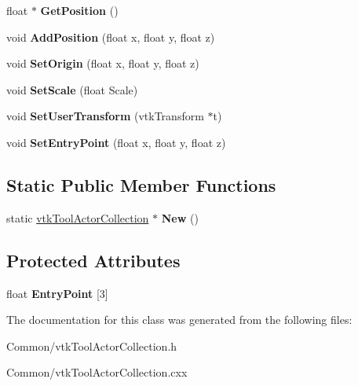 \begin{DoxyCompactItemize}
\item 
\hypertarget{classvtkToolActorCollection_a25382150c57a326ecbc2c5538d9884a7}{
float $\ast$ {\bfseries GetPosition} ()}
\label{classvtkToolActorCollection_a25382150c57a326ecbc2c5538d9884a7}

\item 
\hypertarget{classvtkToolActorCollection_a9169cec363eb65c2f9b40a7a59388d25}{
void {\bfseries AddPosition} (float x, float y, float z)}
\label{classvtkToolActorCollection_a9169cec363eb65c2f9b40a7a59388d25}

\item 
\hypertarget{classvtkToolActorCollection_aabfe1be268bcd17c02f8d83708b3e297}{
void {\bfseries SetOrigin} (float x, float y, float z)}
\label{classvtkToolActorCollection_aabfe1be268bcd17c02f8d83708b3e297}

\item 
\hypertarget{classvtkToolActorCollection_aae253ba215ebc5a6d23822b759ef4861}{
void {\bfseries SetScale} (float Scale)}
\label{classvtkToolActorCollection_aae253ba215ebc5a6d23822b759ef4861}

\item 
\hypertarget{classvtkToolActorCollection_a5ff2ee03fe6996abefc2d7b19b2d7133}{
void {\bfseries SetUserTransform} (vtkTransform $\ast$t)}
\label{classvtkToolActorCollection_a5ff2ee03fe6996abefc2d7b19b2d7133}

\item 
\hypertarget{classvtkToolActorCollection_a51bd81bdb83e94379eed793dfcedcdfd}{
void {\bfseries SetEntryPoint} (float x, float y, float z)}
\label{classvtkToolActorCollection_a51bd81bdb83e94379eed793dfcedcdfd}

\end{DoxyCompactItemize}
\subsection*{Static Public Member Functions}
\begin{DoxyCompactItemize}
\item 
\hypertarget{classvtkToolActorCollection_a941183f16e0ab2075a1a881d19dbbabe}{
static \hyperlink{classvtkToolActorCollection}{vtkToolActorCollection} $\ast$ {\bfseries New} ()}
\label{classvtkToolActorCollection_a941183f16e0ab2075a1a881d19dbbabe}

\end{DoxyCompactItemize}
\subsection*{Protected Attributes}
\begin{DoxyCompactItemize}
\item 
\hypertarget{classvtkToolActorCollection_a5f1faa4e64fa7f67d5c4595bb8d4c4a7}{
float {\bfseries EntryPoint} \mbox{[}3\mbox{]}}
\label{classvtkToolActorCollection_a5f1faa4e64fa7f67d5c4595bb8d4c4a7}

\end{DoxyCompactItemize}


The documentation for this class was generated from the following files:\begin{DoxyCompactItemize}
\item 
Common/vtkToolActorCollection.h\item 
Common/vtkToolActorCollection.cxx\end{DoxyCompactItemize}
